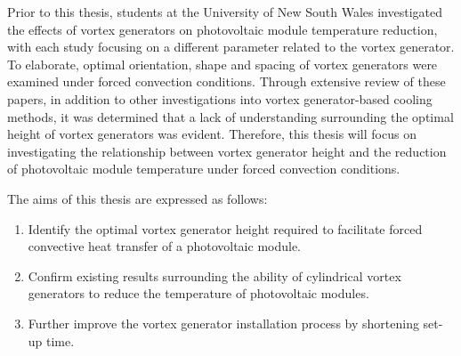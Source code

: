 Prior to this thesis, students at the University of New South Wales investigated the effects of vortex generators on photovoltaic module temperature reduction, with each study focusing on a different parameter related to the vortex generator. To elaborate, optimal orientation, shape and spacing of vortex generators were examined under forced convection conditions. Through extensive review of these papers, in addition to other investigations into vortex generator-based cooling methods, it was determined that a lack of understanding surrounding the optimal height of vortex generators was evident. Therefore, this thesis will focus on investigating the relationship between vortex generator height and the reduction of photovoltaic module temperature under forced convection conditions.\vspace{0.5em}

The aims of this thesis are expressed as follows:
\begin{enumerate}[label=\Roman*.]
    \item Identify the optimal vortex generator height required to facilitate forced convective heat transfer of a photovoltaic module.
    \item Confirm existing results surrounding the ability of cylindrical vortex generators to reduce the temperature of photovoltaic modules.
    \item Further improve the vortex generator installation process by shortening set-up time.
\end{enumerate}

\pagebreak